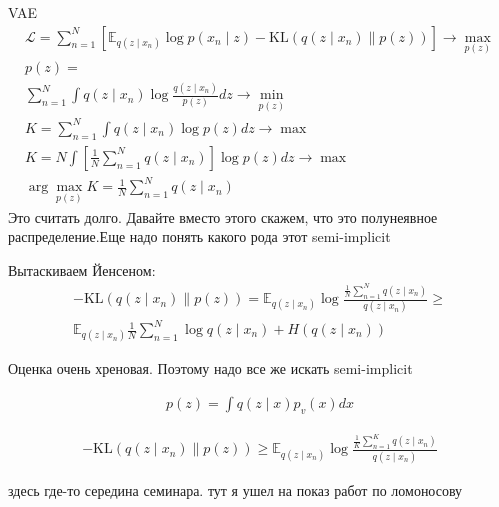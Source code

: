 \documentclass{book}
\begin{document}
VAE
\begin{gather*}
  \mathcal{L}=\sum_{n=1}^{N} {\left[\mathbb{E}_{q(z\mid x_n)}\log p(x_n\mid z)-\mathrm{KL}(q(z\mid x_n)\|p(z))\right]} \rightarrow \max_{p(z)}\\
  p(z)=\\
  \sum_{n=1}^{N} {\int {q(z\mid x_n)\log \frac{q(z\mid x_n)}{p(z)}dz}} \rightarrow \min_{p(z)}\\
  K=\sum_{n=1}^{N} {\int {q(z\mid x_n)\log p(z)dz}} \rightarrow \max\\
  K=N\int\left[\frac{1}{N}\sum_{n=1}^{N} {q(z\mid x_n)}\right]\log p(z)dz \rightarrow \max\\
  \arg\max_{p(z)}K=\frac{1}{N}\sum_{n=1}^{N} {q(z\mid x_n)}
\end{gather*}
Это считать долго. Давайте вместо этого скажем, что это полунеявное распределение.Еще надо понять какого рода этот semi-implicit

Вытаскиваем Йенсеном:
\begin{gather*}
  -\mathrm{KL}\left(q(z\mid x_n)\|p(z)\right)=
  \mathbb{E}_{q(z\mid x_n)}\log \frac{\frac{1}{N}\sum_{n=1}^{N} {q(z\mid x_n)}}{q(z\mid x_n)}\geq\\
  \mathbb{E}_{q(z\mid x_n)}\frac{1}{N}\sum_{n=1}^{N} {\log q(z\mid x_n)}+H(q(z\mid x_n))
\end{gather*}

Оценка очень хреновая. Поэтому надо все же искать semi-implicit

\begin{gather*}
  p(z)=\int {q(z\mid x)p_v(x)dx}
\end{gather*}

\begin{gather*}
  -\mathrm{KL}(q(z\mid x_n)\|p(z)) \geq \mathbb{E}_{q(z\mid x_n)} \log \frac{\frac{1}{K}\sum_{n=1}^{K} {q(z\mid x_n)}}{q(z\mid x_n)}
\end{gather*}

здесь где-то середина семинара. тут я ушел на показ работ по ломоносову
\end{document}
